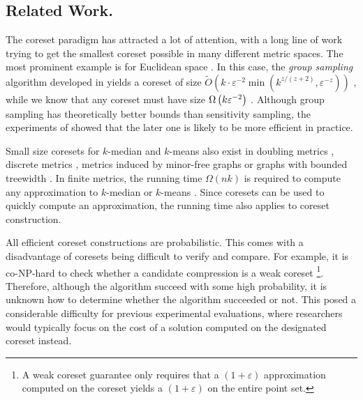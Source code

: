 
\subsection{Related Work.}

The coreset paradigm has attracted a lot of attention, with a long line of work trying to get the smallest coreset possible in many different metric spaces. The
most prominent example is for Euclidean space \cite{BadoiuHI02, HaM04, Chen09, HuangV20, stoc22}.  In this case, the \textit{group sampling} algorithm developed
in \cite{stoc21, stoc22} yields a coreset of size $\tilde{O}(k\cdot \varepsilon^{-2} \min(k^{z/(z+2)},\varepsilon^{-z}))$ \cite{CLSSS22}, while we know that any
coreset must have size $\Omega \left( k\varepsilon^{-2}\right)$ \cite{stoc22}.  Although group sampling has theoretically better bounds than sensitivity sampling, the
experiments of \cite{chrisESA} showed that the later one is likely to be more efficient in practice.

Small size coresets for $k$-median and $k$-means also exist in doubling metrics \cite{huang2018varepsilon}, discrete metrics \cite{FeldmanL11}, metrics induced
by minor-free graphs \cite{BravermanJKW21} or graphs with bounded treewidth \cite{baker2020coresets}.  In finite metrics, the running time $\Omega(nk)$ is
required to compute any approximation to $k$-median or $k$-means \cite{mettu2004optimal}. Since coresets can be used to quickly compute an approximation, the
running time also applies to coreset construction. 

All efficient coreset constructions are probabilistic. This comes with a disadvantage of coresets being difficult to verify and compare. For example, it is
co-NP-hard to check whether a candidate compression is a weak coreset \cite{chrisESA} \footnote{A weak coreset guarantee only requires that a $(1+\varepsilon)$
approximation computed on the coreset yields a $(1+\varepsilon)$ on the entire point set.}. Therefore, although the algorithm succeed with some high
probability, it is unknown how to determine whether the algorithm succeeded or not.  This posed a considerable difficulty for previous experimental evaluations,
where researchers would typically focus on the cost of a solution computed on the designated coreset instead.

